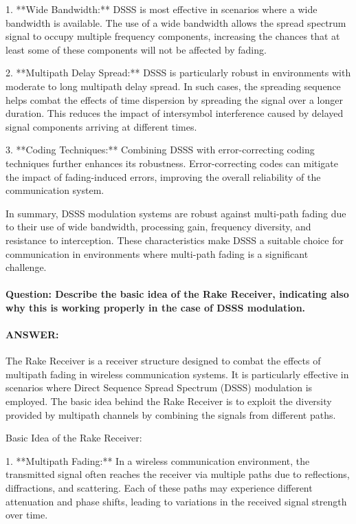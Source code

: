 \documentclass[colorlinks,11pt,a4paper,normalphoto,withhyper,ragged2e]{altareport}
\begin{document}
				1. **Wide Bandwidth:**
				DSSS is most effective in scenarios where a wide bandwidth is available. The use of a wide bandwidth allows the spread spectrum signal to occupy multiple frequency components, increasing the chances that at least some of these components will not be affected by fading.
				
				2. **Multipath Delay Spread:**
				DSSS is particularly robust in environments with moderate to long multipath delay spread. In such cases, the spreading sequence helps combat the effects of time dispersion by spreading the signal over a longer duration. This reduces the impact of intersymbol interference caused by delayed signal components arriving at different times.
				
				3. **Coding Techniques:**
				Combining DSSS with error-correcting coding techniques further enhances its robustness. Error-correcting codes can mitigate the impact of fading-induced errors, improving the overall reliability of the communication system.
				
				In summary, DSSS modulation systems are robust against multi-path fading due to their use of wide bandwidth, processing gain, frequency diversity, and resistance to interception. These characteristics make DSSS a suitable choice for communication in environments where multi-path fading is a significant challenge.
				
				
				
				
				
				\paragraph{Question: Describe the basic idea of the Rake Receiver, indicating also why this is working properly in the case of DSSS modulation.}
				\paragraph{ANSWER:}
				
				The Rake Receiver is a receiver structure designed to combat the effects of multipath fading in wireless communication systems. It is particularly effective in scenarios where Direct Sequence Spread Spectrum (DSSS) modulation is employed. The basic idea behind the Rake Receiver is to exploit the diversity provided by multipath channels by combining the signals from different paths.
				
				Basic Idea of the Rake Receiver:
				
				1. **Multipath Fading:**
				In a wireless communication environment, the transmitted signal often reaches the receiver via multiple paths due to reflections, diffractions, and scattering. Each of these paths may experience different attenuation and phase shifts, leading to variations in the received signal strength over time.
				
\end{document}
